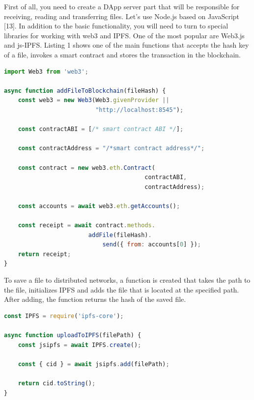 \documentclass[10pt,conference,a4paper]{IEEEtran_EDM}
\begin{document}
First of all, you need to create a DApp server part that will be responsible for receiving, reading and transferring files. Let's use Node.js based on JavaScript [13]. In addition to the basic functionality, you will need to turn to special libraries for working with web3 and IPFS. One of the most popular are Web3.js and js-IPFS. Listing 1 shows one of the main functions that accepts the hash key of a file, invokes a smart contract and stores the transaction in the blockchain.


\begin{lstlisting}[language=JavaScript, caption=JavaScript code implementing saving to the blockchain]
import Web3 from 'web3';

async function addFileToBlockchain(fileHash) {
    const web3 = new Web3(Web3.givenProvider ||
                          "http://localhost:8545");

    const contractABI = [/* smart contract ABI */];

    const contractAddress = "/*smart contract address*/";

    const contract = new web3.eth.Contract(
                                        contractABI,
                                        contractAddress);

    const accounts = await web3.eth.getAccounts();

    const receipt = await contract.methods.
                        addFile(fileHash).
                            send({ from: accounts[0] });
    return receipt;
}
\end{lstlisting}

To save a file to distributed networks, a function is created that takes the path to the file, initializes IPFS and adds the file that is located at the specified path. After adding, the function returns the hash of the saved file.

\begin{lstlisting}[language=JavaScript, caption= Saving a file to IPFS]
const IPFS = require('ipfs-core');

async function uploadToIPFS(filePath) {
    const jsipfs = await IPFS.create();

    const { cid } = await jsipfs.add(filePath);

    return cid.toString();
}
\end{lstlisting}
\end{document}
